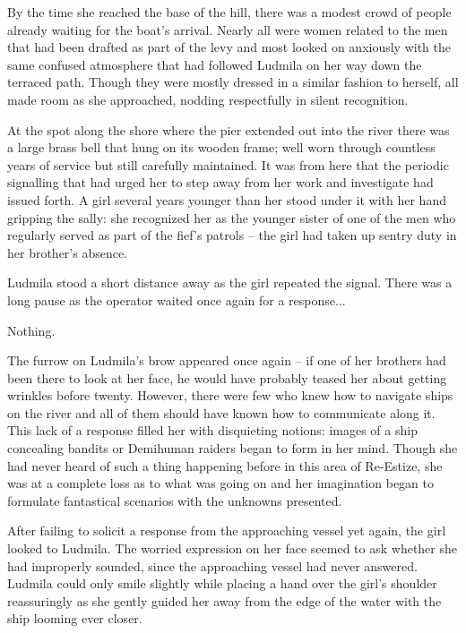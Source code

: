  

By the time she reached the base of the hill, there was a modest crowd of people already waiting for the boat’s arrival. Nearly all were women related to the men that had been drafted as part of the levy and most looked on anxiously with the same confused atmosphere that had followed Ludmila on her way down the terraced path. Though they were mostly dressed in a similar fashion to herself, all made room as she approached, nodding respectfully in silent recognition.

 

At the spot along the shore where the pier extended out into the river there was a large brass bell that hung on its wooden frame; well worn through countless years of service but still carefully maintained. It was from here that the periodic signalling that had urged her to step away from her work and investigate had issued forth. A girl several years younger than her stood under it with her hand gripping the sally: she recognized her as the younger sister of one of the men who regularly served as part of the fief’s patrols – the girl had taken up sentry duty in her brother’s absence.

 

Ludmila stood a short distance away as the girl repeated the signal. There was a long pause as the operator waited once again for a response...

 

Nothing.

 

The furrow on Ludmila’s brow appeared once again – if one of her brothers had been there to look at her face, he would have probably teased her about getting wrinkles before twenty. However, there were few who knew how to navigate ships on the river and all of them should have known how to communicate along it. This lack of a response filled her with disquieting notions: images of a ship concealing bandits or Demihuman raiders began to form in her mind. Though she had never heard of such a thing happening before in this area of Re-Estize, she was at a complete loss as to what was going on and her imagination began to formulate fantastical scenarios with the unknowns presented.

 

After failing to solicit a response from the approaching vessel yet again, the girl looked to Ludmila. The worried expression on her face seemed to ask whether she had improperly sounded, since the approaching vessel had never answered. Ludmila could only smile slightly while placing a hand over the girl’s shoulder reassuringly as she gently guided her away from the edge of the water with the ship looming ever closer.

